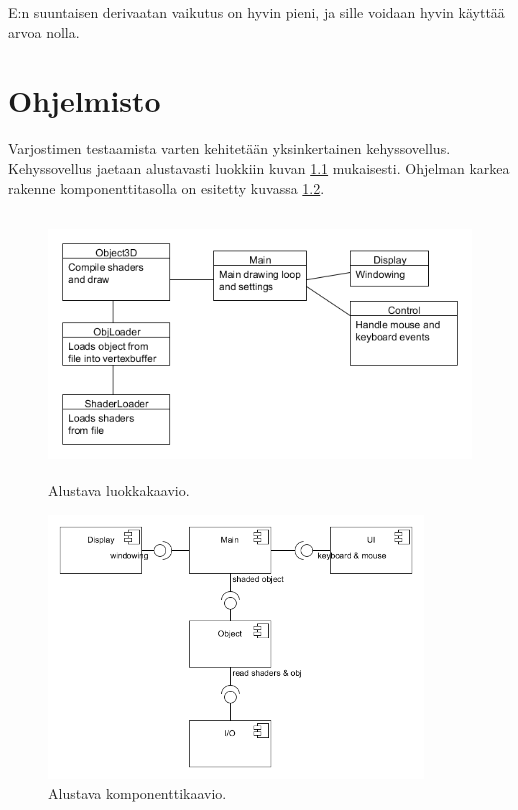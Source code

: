 \documentclass[utf8,bachelor]{gradu3}
\begin{document}
E:n suuntaisen derivaatan vaikutus on hyvin pieni, ja sille voidaan hyvin käyttää arvoa nolla.

\chapter{Ohjelmisto}

Varjostimen testaamista varten kehitetään yksinkertainen kehyssovellus. Kehyssovellus jaetaan alustavasti luokkiin kuvan \ref{fig:ClassDiagram} mukaisesti. Ohjelman karkea rakenne komponenttitasolla on esitetty kuvassa \ref{fig:ComponentDiagram}.

\begin{figure}[h] 
	\centering
	\includegraphics[height=7cm]{ClassDiagram.png}
	\caption{Alustava luokkakaavio.}
	\label{fig:ClassDiagram}
\end{figure}

\begin{figure}[h] 
	\centering
	\includegraphics[height=7cm]{ComponentDiagram.png}
	\caption{Alustava komponenttikaavio.}
	\label{fig:ComponentDiagram}
\end{figure}

\printbibliography 
\end{document}
